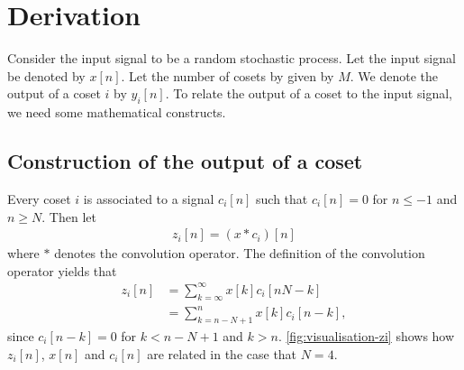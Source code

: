 \documentclass[a4paper, openany, oneside]{memoir}
\begin{document}
\section{Derivation}
Consider the input signal to be a random stochastic process. Let the input signal be denoted by $x[n]$. Let the number of cosets by given by $M$. We denote the output of a coset $i$ by $y_i[n]$. To relate the output of a coset to the input signal, we need some mathematical constructs.

\subsection{Construction of the output of a coset}
Every coset $i$ is associated to a signal $c_i[n]$ such that $c_i[n] = 0$ for $n \le -1$ and $n \ge N$. Then let
\begin{align*}
    z_i[n] = (x \ast c_i)[n]
\end{align*}
where $\ast$ denotes the convolution operator. The definition of the convolution operator yields that
\begin{align*}
    z_i[n] &= \sum_{k=\infty}^{\infty}x[k] c_i[nN-k] \\
    &= \sum_{k=n-N+1}^{n} x[k] c_i[n-k],
\end{align*}
since $c_i[n-k]=0$ for $k < n-N+1$ and $k > n$. \cref{fig:visualisation-zi} shows how $z_i[n]$, $x[n]$ and $c_i[n]$ are related in the case that $N=4$.
\end{document}
